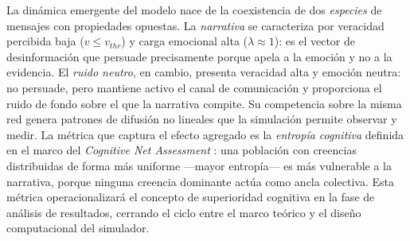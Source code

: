 La dinámica emergente del modelo nace de la coexistencia de dos \emph{especies} de mensajes con propiedades opuestas.
La \emph{narrativa} se caracteriza por veracidad percibida baja ($v \leq v_{thr}$) y carga emocional alta ($\lambda \approx 1$): es el vector de desinformación que persuade precisamente porque apela a la emoción y no a la evidencia.
El \emph{ruido neutro}, en cambio, presenta veracidad alta y emoción neutra: no persuade, pero mantiene activo el canal de comunicación y proporciona el ruido de fondo sobre el que la narrativa compite.
Su competencia sobre la misma red genera patrones de difusión no lineales que la simulación permite observar y medir.
La métrica que captura el efecto agregado es la \emph{entropía cognitiva} definida en el marco del \emph{Cognitive Net Assessment} \cite{PolytechniqueCNA2026}: una población con creencias distribuidas de forma más uniforme ---mayor entropía--- es más vulnerable a la narrativa, porque ninguna creencia dominante actúa como ancla colectiva.
Esta métrica operacionalizará el concepto de superioridad cognitiva en la fase de análisis de resultados, cerrando el ciclo entre el marco teórico y el diseño computacional del simulador.
